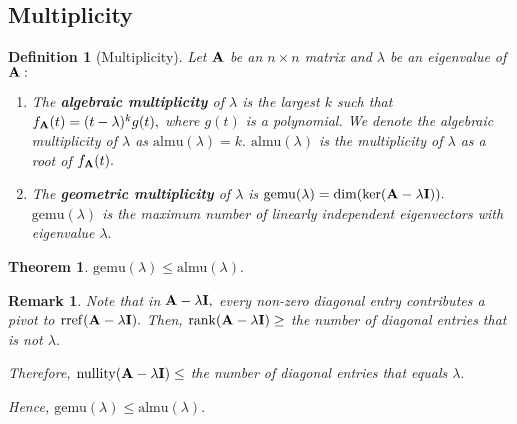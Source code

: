 \documentclass[12pt, a4paper]{article}
\newtheorem{thm}{Theorem}[subsection]
\newtheorem{df}{Definition}[subsection]
\newtheorem*{rmk}{\indent Remark}
\def\rref{\mathrm{rref}}
\def\rank{\mathrm{rank}}
\def\nullity{\mathrm{nullity}}
\def\almu{\mathrm{almu}}
\def\gemu{\mathrm{gemu}}
\def\matrixA{\vb{A}}
\def\matrixI{\vb{I}}
\begin{document}
\subsection{Multiplicity}
\begin{df}[Multiplicity]
	Let $\matrixA$ be an $n\times n$ matrix and $\lambda$ be an eigenvalue of $\matrixA:$
	\begin{enumerate}
		\item The \textbf{algebraic multiplicity} of $\lambda$ is the largest $k$ such that $f_{\matrixA}(t)=(t-\lambda)^kg(t),$ where $g(t)$ is a polynomial. We denote the algebraic multiplicity of $\lambda$ as $\almu(\lambda)=k.$ $\almu(\lambda)$ is the multiplicity of $\lambda$ as a root of $f_{\matrixA}(t).$
		\item The \textbf{geometric multiplicity} of $\lambda$ is $\gemu(\lambda)=\dim(\ker(\matrixA-\lambda\matrixI)).$ $\gemu(\lambda)$ is the maximum number of linearly independent eigenvectors with eigenvalue $\lambda.$
	\end{enumerate}	
\end{df}
\begin{thm}
$\gemu(\lambda)\leq\almu(\lambda).$	
\end{thm}
\begin{rmk}
	Note that in $\matrixA-\lambda\matrixI,$ every non-zero diagonal entry contributes a pivot to $\rref(\matrixA-\lambda\matrixI).$ Then, $\rank(\matrixA-\lambda\matrixI)\geq$ the number of diagonal entries that is not $\lambda.$\par  Therefore, $\nullity(\matrixA-\lambda\matrixI)\leq$ the number of diagonal entries that equals $\lambda.$\par Hence, $\gemu(\lambda)\leq\almu(\lambda).$
\end{rmk}
\end{document}
